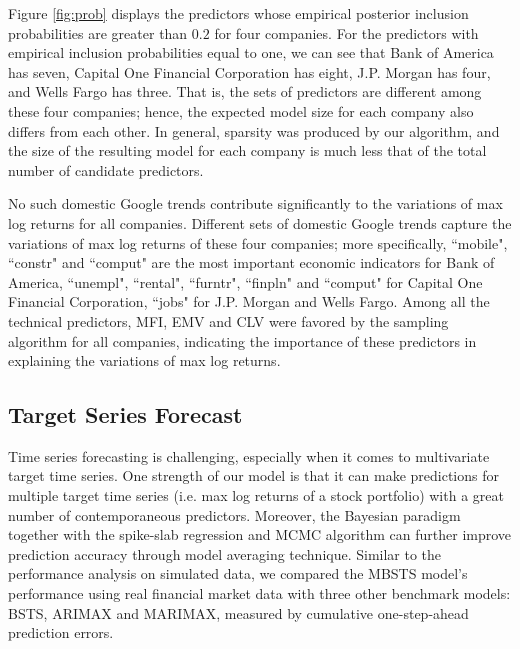\documentclass[twoside,11pt]{article}
\begin{document}
Figure \ref{fig:prob} displays the predictors whose empirical posterior inclusion probabilities are greater than $0.2$ for four companies. For the predictors with empirical inclusion probabilities equal to one, we can see that
Bank of America has seven, Capital One Financial Corporation has eight, J.P. Morgan has four, and Wells Fargo has three.
That is, the sets of predictors are different among these four companies; hence, the expected model size for each company also differs from each other. In general, sparsity was produced by our algorithm, and the size of the resulting model for each company is much less that of the total number of candidate predictors.


No such domestic Google trends contribute significantly to the variations of max log returns for all companies. Different sets of domestic Google trends capture the variations of max log returns of these four companies; more specifically, ``mobile", ``constr" and ``comput" are the most important economic indicators for Bank of America, ``unempl", ``rental", ``furntr", ``finpln" and ``comput" for Capital One Financial Corporation, ``jobs" for J.P. Morgan and Wells Fargo.
Among all the technical predictors, MFI, EMV and CLV were favored by the sampling algorithm
for all companies, indicating the importance of these predictors in explaining the variations of max log returns.




\subsection{Target Series Forecast}
Time series forecasting is challenging, especially when it comes to multivariate target time series. One strength of our model is that it can make predictions for multiple target time series (i.e. max log returns of a stock portfolio) with a great number of contemporaneous predictors. Moreover, the Bayesian paradigm together with the spike-slab regression and MCMC algorithm can further improve prediction accuracy through model averaging technique. Similar to the performance analysis on simulated data, we compared the MBSTS model's performance using real financial market data with three other benchmark models: BSTS, ARIMAX and MARIMAX, measured by cumulative one-step-ahead prediction errors.
\end{document}
